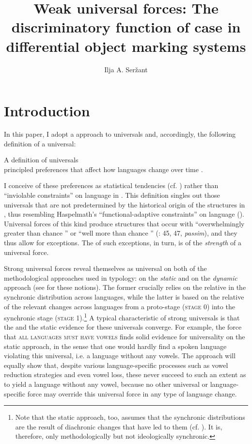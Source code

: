 \documentclass[output=paper]{langsci/langscibook}
\author{Ilja A. Seržant\affiliation{Leipzig University}}
\title{Weak universal forces: The discriminatory function of case in differential object marking systems}
\begin{document}
\maketitle 
 

\section{Introduction}

In this paper, I adopt a  approach to universals \citep{Greenberg1978_Diachr} and, accordingly, the following definition of a universal:

\ea\label{ex:serzant:1}
A  definition of universals\\
principled preferences that affect how languages change over time \citep[401]{Bickel2011_Modelling}.
\z

I conceive of these preferences as statistical tendencies (cf. \citealt{Bickel2011_Modelling}) rather than “inviolable constraints” on language in \citet{Kiparsky2008}. This definition singles out those universals that are not predetermined by the historical origin of the structures in , thus resembling Haspelmath’s “functional-adaptive constraints” on language (). Universal forces of this kind produce structures that occur with “overwhelmingly greater than chance ” or “well more than chance ” (\citealt{Greenberg1963}: 45, 47, \textit{passim}), and they thus allow for exceptions. The  of such exceptions, in turn, is  of the \textit{strength} of a universal force. 

Strong universal forces reveal themselves as universal on both of the methodological approaches used in typology: on the \textit{static} and on the \textit{dynamic} approach (see \citealt{Greenberg1969} for these notions). The former crucially relies on the relative  in the synchronic distribution across languages, while the latter is based on the relative  of the relevant changes across languages from a proto-stage (\textsc{stage} 0) into the synchronic stage (\textsc{stage} 1).\footnote{Note that the static approach, too, assumes that the synchronic distributions are the result of diachronic changes that have led to them (cf. ). It is, therefore, only methodologically but not ideologically synchronic.} A typical characteristic of strong universals is that the  and the static evidence for these universals converge. For example, the force that \textsc{all languages must have vowels} \citep[19]{Comrie1989} finds solid evidence for universality on the static approach, in the sense that one would hardly find a spoken language violating this universal, i.e. a language without any vowels. The  approach will equally show that, despite various language-specific processes such as vowel reduction strategies and even vowel loss, these never succeed to such an extent as to yield a language without any vowel, because no other universal or language-specific force may override this universal force in any type of language change.  
\end{document}
